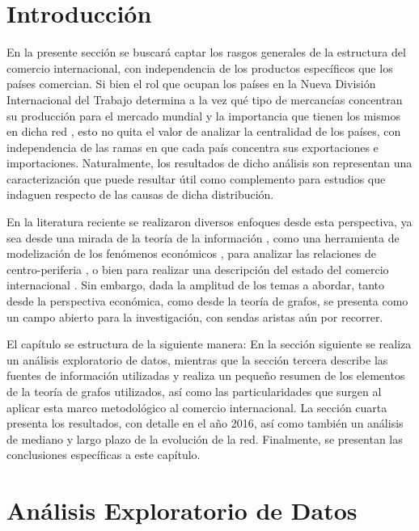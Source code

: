 \documentclass[class=article, crop=false]{standalone}
\begin{document}
\section{Introducción}

En la presente sección se buscará captar los rasgos generales de la estructura del comercio internacional, con independencia de los productos específicos que los países comercian. Si bien el rol que ocupan los países en la Nueva División Internacional del Trabajo determina a la vez qué tipo de mercancías concentran su producción para el mercado mundial y la importancia que tienen los mismos en dicha red \citep{frobel1978new}, esto no quita el valor de analizar la centralidad de los países, con independencia de las ramas en que cada país concentra sus exportaciones e importaciones. Naturalmente, los resultados de dicho análisis son representan una caracterización que puede resultar útil como complemento para estudios que indaguen respecto de las causas de dicha distribución.

En la literatura reciente se realizaron diversos enfoques desde esta perspectiva, ya sea desde una mirada de la teoría de la información \cite{Bhattacharya2008},  como una herramienta de modelización de los fenómenos económicos \cite{Fan2014}, para analizar las relaciones de centro-periferia \cite{Fagiolo2010}, o bien para realizar una descripción del estado del comercio internacional \cite{Chow2013}. Sin embargo, dada la amplitud de los temas a abordar, tanto desde la perspectiva económica, como desde la teoría de grafos, se presenta como un campo abierto para la investigación, con sendas aristas aún por recorrer.        

El capítulo se estructura de la siguiente manera: En la sección siguiente se realiza un análisis exploratorio de datos, mientras que la sección tercera describe las fuentes de información utilizadas y realiza un pequeño resumen de los elementos de la teoría de grafos utilizados, así como las particularidades que surgen al aplicar esta marco metodológico al comercio internacional. La sección cuarta presenta los resultados, con detalle en el año 2016, así como también un análisis de mediano y largo plazo de la evolución de la red. Finalmente, se presentan las conclusiones específicas a este capítulo.


\section{Análisis Exploratorio de Datos}
\end{document}
